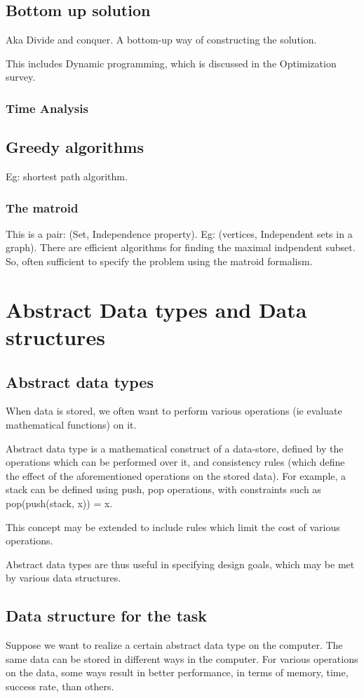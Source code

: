 \documentclass[oneside, article]{memoir}
\begin{document}
\section{Bottom up solution}
Aka Divide and conquer. A bottom-up way of constructing the solution. 

This includes Dynamic programming, which is discussed in the Optimization survey.

\subsection{Time Analysis}
\tbc

\section{Greedy algorithms}
Eg: shortest path algorithm.

\subsection{The matroid}
This is a pair: (Set, Independence property). Eg: (vertices, Independent sets in a graph). There are efficient algorithms for finding the maximal indpendent subset. So, often sufficient to specify the problem using the matroid formalism.

\chapter{Abstract Data types and Data structures}
\section{Abstract data types}
When data is stored, we often want to perform various operations (ie evaluate mathematical functions) on it.

Abstract data type is a mathematical construct of a data-store, defined by the operations which can be performed over it, and consistency rules (which define the effect of the aforementioned operations on the stored data). For example, a stack can be defined using push, pop operations, with constraints such as pop(push(stack, x)) = x.

This concept may be extended to include rules which limit the cost of various operations.

Abstract data types are thus useful in specifying design goals, which may be met by various data structures.

\section{Data structure for the task}
Suppose we want to realize a certain abstract data type on the computer. The same data can be stored in different ways in the computer. For various operations on the data, some ways result in better performance, in terms of memory, time, success rate, than others.
\end{document}
